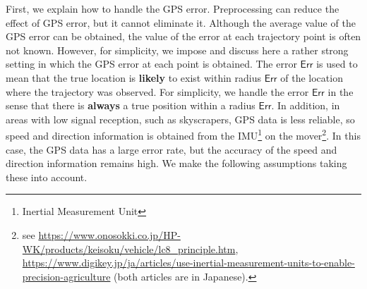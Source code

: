 \documentclass{article}
\numberwithin{equation}{section}
\theoremstyle{definition}
\newtheorem{setdef}[setdef]{Setting \& Definition}
\newcommand{\dis}{\displaystyle}
\newcommand{\CR}{\mathcal{CR}}
\newcommand{\R}{\mathbb{R}}
\def\:={\coloneqq} %
\begin{document}

First, we explain how to handle the GPS error.
Preprocessing can reduce the effect of GPS error, but it cannot eliminate it.
Although the average value of the GPS error can be obtained, the value of the error at each trajectory point is often not known.
However, for simplicity, we impose and discuss here a rather strong setting in which the GPS error at each point is obtained.
The error $\mathsf{Err}$ is used to mean that the true location is \textbf{likely} to exist within radius $\mathsf{Err}$ of the location where the trajectory was observed.
For simplicity, we handle the error $\mathsf{Err}$ in the sense that there is \textbf{always} a true position within a radius $\mathsf{Err}$.
In addition, in areas with low signal reception, such as skyscrapers, GPS data is less reliable, so speed and direction information is obtained from the IMU\footnote{Inertial Measurement Unit}
on the mover\footnote{see 
\url{https://www.onosokki.co.jp/HP-WK/products/keisoku/vehicle/lc8_principle.htm}, \\
\url{https://www.digikey.jp/ja/articles/use-inertial-measurement-units-to-enable-precision-agriculture} 
(both articles are in Japanese).}.
In this case, the GPS data has a large error rate, but the accuracy of the speed and direction information remains high.
We make the following assumptions taking these into account.
\end{document}

